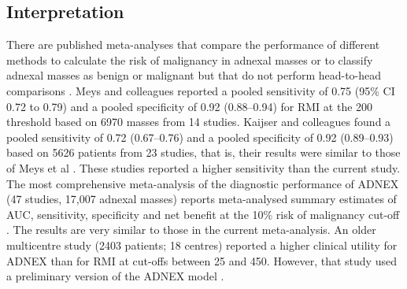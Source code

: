 \subsection{Interpretation}
There are published meta-analyses that compare the performance of different methods
to calculate the risk of malignancy in adnexal masses or to classify adnexal masses
as benign or malignant but that do not perform head-to-head comparisons
 \cite{kaijserPresurgicalDiagnosisAdnexal2014,meysSubjectiveAssessmentUltrasound2016}.
Meys and colleagues \cite{meysSubjectiveAssessmentUltrasound2016} reported a pooled
sensitivity of 0.75 (95\% \gls{CI} 0.72 to 0.79) and a pooled specificity of 0.92
(0.88--0.94) for \gls{RMI} at the 200 threshold based on 6970 masses from 14 studies.
Kaijser and colleagues \cite{kaijserPresurgicalDiagnosisAdnexal2014} found a pooled
sensitivity of 0.72 (0.67--0.76) and a pooled specificity of 0.92 (0.89--0.93)
based on 5626 patients from 23 studies, that is, their results were similar to those
of Meys et al \cite{meysSubjectiveAssessmentUltrasound2016}. These studies reported a
higher sensitivity than the current study. The most comprehensive meta-analysis of
the diagnostic performance of \gls{ADNEX} (47 studies, 17,007 adnexal masses) reports
meta-analysed summary estimates of \gls{AUC}, sensitivity, specificity and net benefit at
the 10\% risk of malignancy cut-off \cite{barrenadaADNEXRiskPrediction2024}. The
results are very similar to those in the current meta-analysis. An older multicentre
study (2403 patients; 18 centres) reported a higher clinical utility for \gls{ADNEX} than
for \gls{RMI} at cut-offs between 25 and 450. However, that study used a preliminary
version of the \gls{ADNEX} model \cite{wynantsClinicalUtilityRisk2017}.

